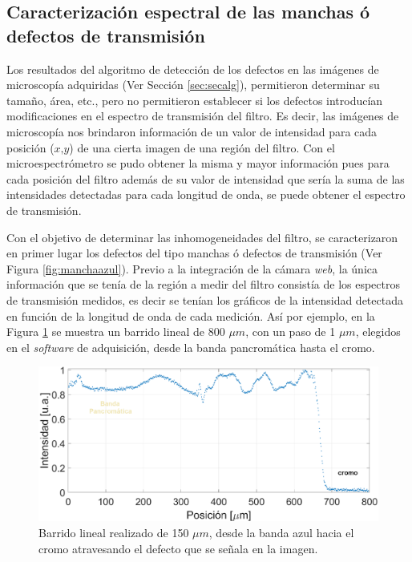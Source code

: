 
\singlespacing
\subsection{Caracterización espectral de las manchas ó defectos de transmisión}
\label{sec:defctma}

\hspace{0.5cm}Los resultados del algoritmo de detección de los defectos en las imágenes de microscopía adquiridas (Ver Sección \ref{sec:secalg}), permitieron determinar su tamaño, área, etc., pero no permitieron establecer si los defectos introducían modificaciones en el espectro de transmisión del filtro. Es decir, las imágenes de microscopía nos brindaron información de un valor de intensidad para cada posición ($\textit{x,y}$) de una cierta imagen de una región del filtro. Con el microespectrómetro se pudo obtener la misma y mayor información pues para cada posición del filtro además de su valor de intensidad que sería la suma de las intensidades detectadas para cada longitud de onda, se puede obtener el espectro de transmisión.

Con el objetivo de determinar las inhomogeneidades del filtro, se caracterizaron en primer lugar los defectos del tipo manchas ó defectos de transmisión (Ver Figura \ref{fig:manchaazul}). Previo a la integración de la cámara \textit{web}, la única información que se tenía de la región a medir del filtro consistía de los espectros de transmisión medidos, es decir se tenían los gráficos de la intensidad detectada en función de la longitud de onda de cada medición. Así por ejemplo, en la Figura \ref{fig:muchossi} se muestra un barrido lineal de  800 $\mu m$, con un paso de 1 $\mu m$, elegidos en el \textit{software} de adquisición, desde la banda pancromática hasta el cromo. 

 \begin{figure}[H]
	\centering
	\includegraphics[width=1.0\textwidth]{Figs/microespectrometro/defectosmuchossinvis.png}
	\caption{Barrido lineal realizado de 150 $\mu m$, desde la banda azul hacia el cromo atravesando el defecto que se señala en la imagen.}
	\label{fig:muchossi}
\end{figure}


